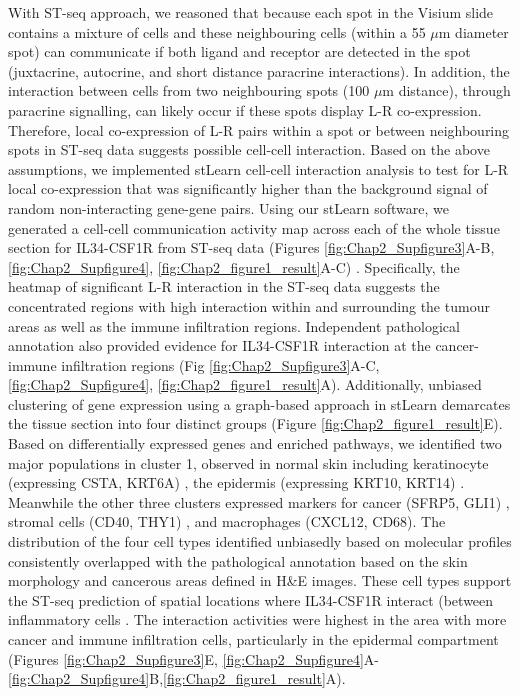 With ST-seq approach, we reasoned that because each spot in the Visium slide contains a mixture of cells and these neighbouring cells (within a 55 $\mu$m diameter spot) can communicate if both ligand and receptor are detected in the spot (juxtacrine, autocrine, and short distance paracrine interactions). In addition, the interaction between cells from two neighbouring spots (100 $\mu$m distance), through paracrine signalling, can likely occur if these spots display L-R co-expression. Therefore, local co-expression of L-R pairs within a spot or between neighbouring spots in ST-seq data suggests possible cell-cell interaction. Based on the above assumptions, we implemented stLearn cell-cell interaction analysis to test for L-R local co-expression that was significantly higher than the background signal of random non-interacting gene-gene pairs. Using our stLearn software, we generated a cell-cell communication activity map across each of the whole tissue section for IL34-CSF1R from ST-seq data (Figures \ref{fig:Chap2_Supfigure3}A-B, \ref{fig:Chap2_Supfigure4}, \ref{fig:Chap2_figure1_result}A-C) \cite{pham2020stlearn}. Specifically, the heatmap of significant L-R interaction in the ST-seq data suggests the concentrated regions with high interaction within and surrounding the tumour areas as well as the immune infiltration regions. Independent pathological annotation also provided evidence for IL34-CSF1R interaction at the cancer-immune infiltration regions (Fig \ref{fig:Chap2_Supfigure3}A-C, \ref{fig:Chap2_Supfigure4}, \ref{fig:Chap2_figure1_result}A). Additionally, unbiased clustering of gene expression using a graph-based approach in stLearn demarcates the tissue section into four distinct groups (Figure \ref{fig:Chap2_figure1_result}E). Based on differentially expressed genes and enriched pathways, we identified two major populations in cluster 1, observed in normal skin including keratinocyte (expressing CSTA, KRT6A) \cite{finnegan2019single}, the epidermis (expressing KRT10, KRT14) \cite{ji2020multimodal}. Meanwhile the other three clusters expressed markers for cancer (SFRP5, GLI1) \cite{lacour2002carcinogenesis, ji2020multimodal}, stromal cells (CD40, THY1) \cite{koumas2003thy}, and macrophages (CXCL12, CD68). The distribution of the four cell types identified unbiasedly based on molecular profiles consistently overlapped with the pathological annotation based on the skin morphology and cancerous areas defined in H\&E images. These cell types support the ST-seq prediction of spatial locations where IL34-CSF1R interact (between inflammatory cells \cite{lin2019function}. The interaction activities were highest in the area with more cancer and immune infiltration cells, particularly in the epidermal compartment (Figures \ref{fig:Chap2_Supfigure3}E, \ref{fig:Chap2_Supfigure4}A-\ref{fig:Chap2_Supfigure4}B,\ref{fig:Chap2_figure1_result}A).  
